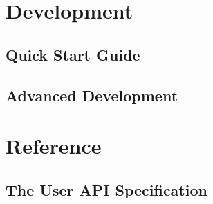 \documentclass[twoside,11pt]{book}
\begin{document}
\newpage

\tableofcontents

\newpage

\setcounter{page}{1}







\chapter{Development}

\section{Quick Start Guide}
\label{getting_started}


\section{Advanced Development}
\label{development}




%

\chapter{Reference}

\section{The User API Specification}
\label{API}
\sloppy


\newpage



\newpage



\newpage
\end{document}

